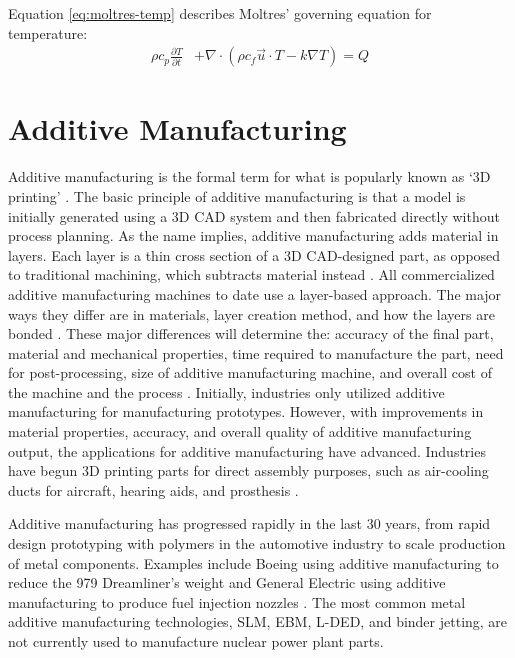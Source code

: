 Equation \ref{eq:moltres-temp} describes Moltres' governing equation for temperature:
\begin{align}
    \label{eq:moltres-temp}
    \rho c_p\frac{\partial T}{\partial t} &+ \nabla\cdot\left(\rho
        c_f \vec{u}\cdot T -k\nabla T\right) =  Q
\end{align} 

\section{Additive Manufacturing}
Additive manufacturing is the formal term for what is popularly known as `3D printing' 
\cite{gibson_additive_2014}. 
The basic principle of additive manufacturing is that a model is initially generated using a
\gls{3D CAD} system and then fabricated directly without process planning. 
As the name implies, additive manufacturing adds material in layers. 
Each layer is a thin cross section of a \gls{3D CAD}-designed part, as opposed 
to traditional machining, which subtracts material instead 
\cite{standard_standard_2012}. 
All commercialized additive manufacturing machines to date use a layer-based 
approach.
The major ways they differ are in materials, layer creation method, and 
how the layers are bonded \cite{gibson_additive_2014}.
These major differences will determine the: accuracy of the 
final part, material and mechanical properties, time required to manufacture 
the part, need for post-processing, size of additive manufacturing machine, and overall 
cost of the machine and the process \cite{gibson_additive_2014}. 
Initially, industries only utilized additive manufacturing for manufacturing 
prototypes. 
However, with improvements in material properties, accuracy, and overall 
quality of additive manufacturing output, the applications for additive 
manufacturing have advanced. 
Industries have begun 3D printing parts for direct assembly purposes, 
such as air-cooling ducts for aircraft, hearing aids, and prosthesis
\cite{uriondo_present_2015}.  

Additive manufacturing has progressed rapidly in the last 30 years, from rapid 
design prototyping with polymers in the automotive industry to scale production 
of metal components.  
Examples include Boeing using additive manufacturing to reduce the 979 
Dreamliner's weight \cite{noauthor_printed_2017} and General Electric using 
additive manufacturing to produce fuel injection nozzles 
\cite{noauthor_transformation_2018}. 
The most common metal additive manufacturing technologies, \gls{SLM}, \gls{EBM}, 
\gls{L-DED}, and binder jetting, are not currently used to manufacture nuclear 
power plant parts. 

